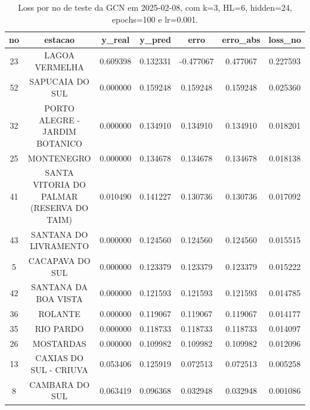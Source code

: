 \begin{table}[h]
\centering
\caption{Loss por no de teste da GCN em 2025-02-08, com k=3, HL=6, hidden=24, epochs=100 e lr=0.001.}
\label{tab:gcn_loss_k3_hl6_h24_e100_d20250208}
\begin{tabular}{ccccccc}
\toprule
no & estacao & y\_real & y\_pred & erro & erro\_abs & loss\_no \\
\midrule
23 & LAGOA VERMELHA & 0.609398 & 0.132331 & -0.477067 & 0.477067 & 0.227593 \\
52 & SAPUCAIA DO SUL & 0.000000 & 0.159248 & 0.159248 & 0.159248 & 0.025360 \\
32 & PORTO ALEGRE - JARDIM BOTANICO & 0.000000 & 0.134910 & 0.134910 & 0.134910 & 0.018201 \\
25 & MONTENEGRO & 0.000000 & 0.134678 & 0.134678 & 0.134678 & 0.018138 \\
41 & SANTA VITORIA DO PALMAR (RESERVA DO TAIM) & 0.010490 & 0.141227 & 0.130736 & 0.130736 & 0.017092 \\
43 & SANTANA DO LIVRAMENTO & 0.000000 & 0.124560 & 0.124560 & 0.124560 & 0.015515 \\
5 & CACAPAVA DO SUL & 0.000000 & 0.123379 & 0.123379 & 0.123379 & 0.015222 \\
42 & SANTANA DA BOA VISTA & 0.000000 & 0.121593 & 0.121593 & 0.121593 & 0.014785 \\
36 & ROLANTE & 0.000000 & 0.119067 & 0.119067 & 0.119067 & 0.014177 \\
35 & RIO PARDO & 0.000000 & 0.118733 & 0.118733 & 0.118733 & 0.014097 \\
26 & MOSTARDAS & 0.000000 & 0.109982 & 0.109982 & 0.109982 & 0.012096 \\
13 & CAXIAS DO SUL - CRIUVA & 0.053406 & 0.125919 & 0.072513 & 0.072513 & 0.005258 \\
8 & CAMBARA DO SUL & 0.063419 & 0.096368 & 0.032948 & 0.032948 & 0.001086 \\
\bottomrule
\end{tabular}
\end{table}
